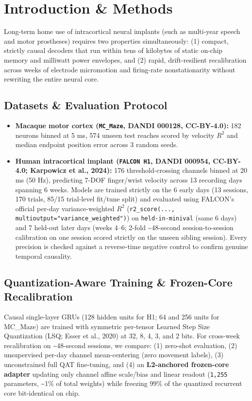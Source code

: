 \documentclass[11pt,a4paper]{article}
\begin{document}
\section{Introduction \& Methods}
Long-term home use of intracortical neural implants (such as multi-year speech and motor prostheses) requires two properties simultaneously: (1) compact, strictly causal decoders that run within tens of kilobytes of static on-chip memory and milliwatt power envelopes, and (2) rapid, drift-resilient recalibration across weeks of electrode micromotion and firing-rate nonstationarity without rewriting the entire neural core.

\subsection{Datasets \& Evaluation Protocol}
\begin{itemize}
\item \textbf{Macaque motor cortex (\texttt{MC\_Maze}, DANDI 000128, CC-BY-4.0):} 182 neurons binned at 5 ms, 574 unseen test reaches scored by velocity $R^2$ and median endpoint position error across 3 random seeds.
\item \textbf{Human intracortical implant (\texttt{FALCON H1}, DANDI 000954, CC-BY-4.0; Karpowicz et al., 2024):} 176 threshold-crossing channels binned at 20 ms (50 Hz), predicting 7-DOF finger/wrist velocity across 13 recording days spanning 6 weeks. Models are trained strictly on the 6 early days (13 sessions, 170 trials, 85/15 trial-level fit/tune split) and evaluated using FALCON's official per-day variance-weighted $R^2$ (\texttt{r2\_score(..., multioutput="variance\_weighted")}) on \texttt{held-in-minival} (same 6 days) and 7 held-out later days (weeks 4--6; 2-fold \textasciitilde{}48-second session-to-session calibration on one session scored strictly on the unseen sibling session). Every precision is checked against a reverse-time negative control to confirm genuine temporal causality.
\end{itemize}
\subsection{Quantization-Aware Training \& Frozen-Core Recalibration}
Causal single-layer GRUs (128 hidden units for H1; 64 and 256 units for MC\_Maze) are trained with symmetric per-tensor Learned Step Size Quantization (LSQ; Esser et al., 2020) at 32, 8, 4, 3, and 2 bits. For cross-week recalibration on \textasciitilde{}48-second sessions, we compare: (1) zero-shot evaluation, (2) unsupervised per-day channel mean-centering (zero movement labels), (3) unconstrained full QAT fine-tuning, and (4) an \textbf{L2-anchored frozen-core adapter} updating only channel affine scale/bias and linear readout (\texttt{1,255} parameters, \textasciitilde{}1\% of total weights) while freezing 99\% of the quantized recurrent core bit-identical on chip.
\end{document}
